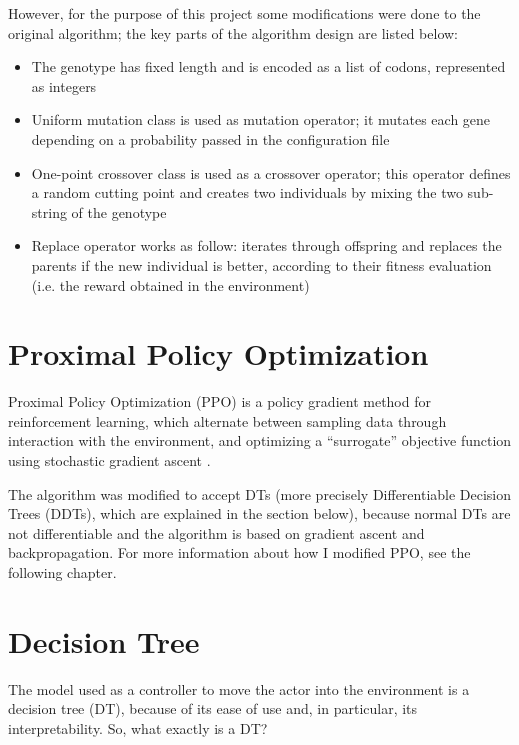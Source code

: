 However, for the purpose of this project some modifications were done to the original algorithm; the key parts of the algorithm design are listed below:
\begin{itemize}
  \item The genotype has fixed length and is encoded as a list of codons, represented as integers
  \item Uniform mutation class is used as mutation operator; it mutates each gene depending on a probability passed in the configuration file
  \item  One-point crossover class is used as a crossover operator; this operator defines a random cutting point and creates two individuals by mixing the two sub-string of the genotype
  \item Replace operator works as follow: iterates through offspring and replaces the parents if the new individual is better, according to their fitness evaluation (i.e. the reward obtained in the environment)
\end{itemize}


\section{Proximal Policy Optimization}
\label{sec:140}
Proximal Policy Optimization (PPO) is a policy gradient method for reinforcement learning, which alternate between sampling data through interaction with the environment, and optimizing a “surrogate” objective function using stochastic gradient ascent \cite{schulman}.

The algorithm was modified to accept DTs (more precisely Differentiable Decision Trees (DDTs), which are explained in the section below), because normal DTs are not differentiable and the algorithm is based on gradient ascent and backpropagation. For more information about how I modified PPO, see the following chapter.


\section{Decision Tree}
\label{sec:150}
The model used as a controller to move the actor into the environment is a decision tree (DT), because of its ease of use and, in particular, its interpretability. So, what exactly is a DT?

